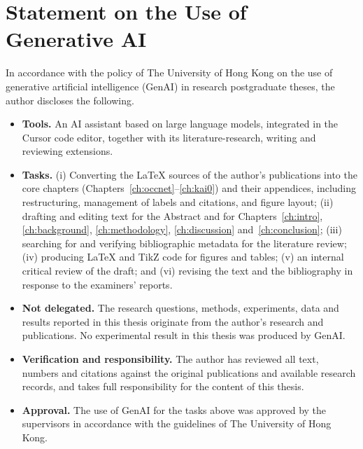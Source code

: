 \chapter*{\centering \Large Statement on the Use of Generative AI}
\thispagestyle{empty}

In accordance with the policy of The University of Hong Kong on the use of generative artificial intelligence (GenAI) in research postgraduate theses, the author discloses the following.

\begin{itemize}[leftmargin=*, itemsep=4pt]
  \item \textbf{Tools.} An AI assistant based on large language models, integrated in the Cursor code editor, together with its literature-research, writing and reviewing extensions.
  \item \textbf{Tasks.} (i) Converting the LaTeX sources of the author's publications into the core chapters (Chapters~\ref{ch:occnet}--\ref{ch:kai0}) and their appendices, including restructuring, management of labels and citations, and figure layout; (ii) drafting and editing text for the Abstract and for Chapters~\ref{ch:intro}, \ref{ch:background}, \ref{ch:methodology}, \ref{ch:discussion} and~\ref{ch:conclusion}; (iii) searching for and verifying bibliographic metadata for the literature review; (iv) producing LaTeX and TikZ code for figures and tables; (v) an internal critical review of the draft; and (vi) revising the text and the bibliography in response to the examiners' reports.
  \item \textbf{Not delegated.} The research questions, methods, experiments, data and results reported in this thesis originate from the author's research and publications. No experimental result in this thesis was produced by GenAI.
  \item \textbf{Verification and responsibility.} The author has reviewed all text, numbers and citations against the original publications and available research records, and takes full responsibility for the content of this thesis.
  \item \textbf{Approval.} The use of GenAI for the tasks above was approved by the supervisors in accordance with the guidelines of The University of Hong Kong.
\end{itemize}
